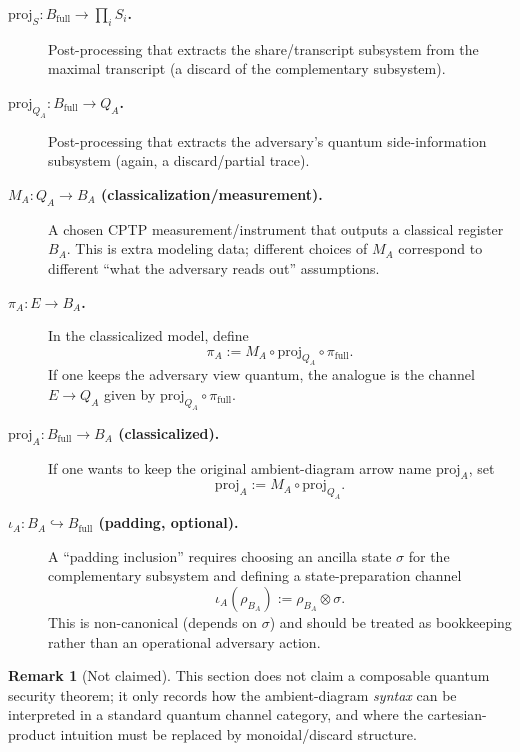 \documentclass[11pt,a4paper]{article}
\theoremstyle{definition}
\newtheorem{remark}[definition]{Remark}
\theoremstyle{plain}
\begin{document}
\begin{description}
    \item[\textbf{$\mathrm{proj}_S:B_{\mathrm{full}}\to \prod_i S_i$.}]
    Post-processing that extracts the share/transcript subsystem from the maximal transcript (a discard of the complementary subsystem).

    \item[\textbf{$\mathrm{proj}_{Q_A}:B_{\mathrm{full}}\to Q_A$.}]
    Post-processing that extracts the adversary's quantum side-information subsystem (again, a discard/partial trace).

    \item[\textbf{$M_A:Q_A\to B_A$ (classicalization/measurement).}]
    A chosen CPTP measurement/instrument that outputs a classical register $B_A$.
    This is extra modeling data; different choices of $M_A$ correspond to different ``what the adversary reads out'' assumptions.

    \item[\textbf{$\pi_A:E\to B_A$.}]
    In the classicalized model, define
    \[
    \pi_A := M_A\circ \mathrm{proj}_{Q_A}\circ \pi_{\mathrm{full}}.
    \]
    If one keeps the adversary view quantum, the analogue is the channel $E\to Q_A$ given by $\mathrm{proj}_{Q_A}\circ \pi_{\mathrm{full}}$.

    \item[\textbf{$\mathrm{proj}_A:B_{\mathrm{full}}\to B_A$ (classicalized).}]
    If one wants to keep the original ambient-diagram arrow name $\mathrm{proj}_A$, set
    \[
    \mathrm{proj}_A := M_A\circ \mathrm{proj}_{Q_A}.
    \]

    \item[\textbf{$\iota_A:B_A\hookrightarrow B_{\mathrm{full}}$ (padding, optional).}]
    A ``padding inclusion'' requires choosing an ancilla state $\sigma$ for the complementary subsystem and defining a state-preparation channel
    \[
    \iota_A(\rho_{B_A}) := \rho_{B_A}\otimes \sigma.
    \]
    This is non-canonical (depends on $\sigma$) and should be treated as bookkeeping rather than an operational adversary action.
\end{description}

\begin{remark}[Not claimed]
This section does not claim a composable quantum security theorem; it only records how the ambient-diagram \emph{syntax} can be interpreted in a standard quantum channel category, and where the cartesian-product intuition must be replaced by monoidal/discard structure.
\end{remark}
\end{document}
